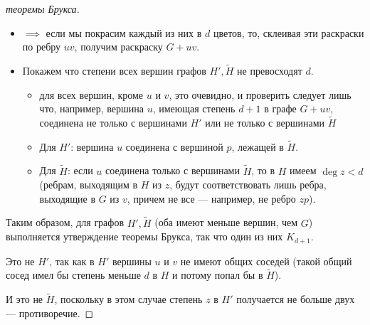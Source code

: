 \begin{proof}[ теоремы Брукса]
\begin{itemize}
        \item $\implies$ если мы покрасим каждый из них в $d$ цветов, то, склеивая эти раскраски по ребру $uv$, получим раскраску $G + uv$.
        
        \item Покажем что степени всех вершин графов $H', \tilde{H}$ не превосходят $d$.
        \begin{itemize}
            \item для всех вершин, кроме $u$ и $v$, это очевидно, и проверить следует лишь что, например, вершина $u$, имеющая степень $d+1$ в графе $G + uv$, соединена не только с вершинами $H'$ или не только с вершинами $\tilde{H}$
        
            \item Для $H'$: вершина $u$ соединена с вершиной $p$, лежащей в $\tilde{H}$.
        
            \item Для $\tilde{H}$: если $u$ соединена только с вершинами $\tilde{H}$, то в $H$ имеем $\deg{z} < d$ (ребрам, выходящим в $H$ из $z$, будут соответствовать лишь ребра, выходящие в $G$ из $v$, причем не все --- например, не ребро $zp$).
        \end{itemize}
    \end{itemize}
    Таким образом, для графов $H', \tilde{H}$ (оба имеют меньше вершин, чем $G$) выполняется утверждение теоремы Брукса, так что один из них $K_{d+1}$.

    Это не $H'$, так как в $H'$ вершины $u$ и $v$ не имеют общих соседей (такой общий сосед имел бы степень меньше $d$ в $H$ и потому попал бы в $\tilde{H}$).

    И это не $\tilde{H}$, поскольку в этом случае степень $z$ в $H'$ получается не больше двух --- противоречие.
\end{proof}
